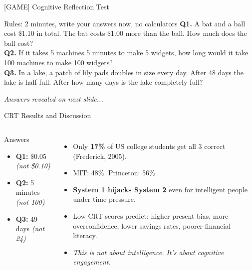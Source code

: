 \documentclass[aspectratio=169]{beamer}
\begin{document}
\begin{frame}[t]{[GAME] Cognitive Reflection Test}
\begin{alertblock}{Rules: 2 minutes, write your answers now, no calculators}
\textbf{Q1.} A bat and a ball cost \$1.10 in total. The bat costs \$1.00 more than the ball. How much does the ball cost? \\[0.4em]
\textbf{Q2.} If it takes 5 machines 5 minutes to make 5 widgets, how long would it take 100 machines to make 100 widgets? \\[0.4em]
\textbf{Q3.} In a lake, a patch of lily pads doubles in size every day. After 48 days the lake is half full. After how many days is the lake completely full?
\end{alertblock}
\medskip
\centering \textit{Answers revealed on next slide...}
\end{frame}

\begin{frame}{CRT Results and Discussion}
\begin{columns}
\begin{block}{Answers}
\begin{itemize}
  \item \textbf{Q1:} \$0.05 \textit{(not \$0.10)}
  \item \textbf{Q2:} 5 minutes \textit{(not 100)}
  \item \textbf{Q3:} 49 days \textit{(not 24)}
\end{itemize}
\end{block}
\begin{itemize}[<+->]
  \item Only \textbf{17\%} of US college students get all 3 correct (Frederick, 2005).
  \item MIT: 48\%. Princeton: 56\%.
  \item \textbf{System 1 hijacks System 2} even for intelligent people under time pressure.
  \item Low CRT scores predict: higher present bias, more overconfidence, lower savings rates, poorer financial literacy.
  \item \textit{This is not about intelligence. It's about cognitive engagement.}
\end{itemize}
\end{columns}
\end{frame}
\end{document}

